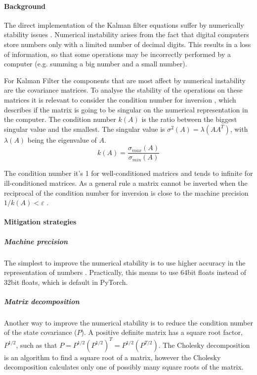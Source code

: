 \documentclass{article}
\begin{document}
\paragraph{Background}
The direct implementation of the Kalman filter equations suffer by numerically stability issues \cite{mohinder_s_grewal_kalman_2001, dan_simon_optimal_2006}. %
Numerical instability arises from the fact that digital computers store numbers only with a limited number of decimal digits. This results in a loss of information, so that some operations may be incorrectly performed by a  computer (e.g. summing a big number and a small number).

For Kalman Filter the components that are most affect by numerical instability are the covariance matrices. To analyse the stability of the operations on these matrices it is relevant to consider the condition number for inversion \cite{mohinder_s_grewal_kalman_2001, kaminski_discrete_1971}, which describes if the matrix is going to be singular on the numerical representation in the computer. The condition number $k(A)$ is the ratio between the biggest singular value and the smallest. The singular value is $\sigma^2(A) = \lambda(AA^T)$, with  $\lambda(A)$ being the eigenvalue of $A$.
\begin{equation}\label{condition_number}
    k(A) = \frac{\sigma_{max}(A)}{\sigma_{min}(A)}
\end{equation}

The condition number it's 1 for well-conditioned matrices and tends to infinite for ill-conditioned matrices. As a general rule  a matrix cannot be inverted when the reciprocal of the condition number for inversion is close to the machine precision $ 1/k(A) < \varepsilon$ \cite{mohinder_s_grewal_kalman_2001}.

\paragraph{Mitigation strategies}

\subparagraph{Machine precision} The simplest to improve the numerical stability is to use higher accuracy in the representation of numbers \cite{dan_simon_optimal_2006}. Practically, this means to use 64bit floats instead of 32bit floats, which is default in PyTorch.

\subparagraph{Matrix decomposition} Another way to improve the numerical stability is to reduce the condition number of the state covariance ($P$). A positive definite matrix has a square root factor, $P^{1/2}$, such as that $P = P^{1/2}(P^{1/2})^T=P^{1/2}(P^{T/2})$.
The Cholesky decomposition is an algorithm to find a square root of a matrix, however the Cholesky decomposition calculates only one of possibly many square roots of the matrix.
\end{document}
